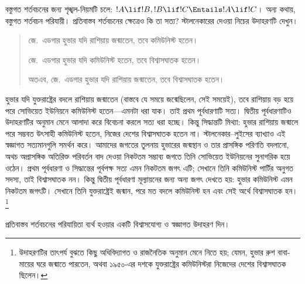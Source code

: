 \documentclass[../../../include/open-logic-section]{subfiles}
\begin{document}


বস্তুগত শর্তবচনের জন্য শৃঙ্খল-নিয়মটি চলে:
$!A \lif !B, !B \lif !C \Entails !A \lif !C$। অন্য কথায়,
বস্তুগত শর্তবচন পরিযায়ী। প্রতিবাস্তব শর্তবচনের ক্ষেত্রেও
কি তা সত্য? স্টালনেকারের দেওয়া নিচের উদাহরণটি দেখুন।
\begin{quote}
  জে.~এডগার হুভার যদি রাশিয়ায় জন্মাতেন, তবে কমিউনিস্ট হতেন।

  জে.~এডগার হুভার যদি কমিউনিস্ট হতেন, তবে বিশ্বাসঘাতক হতেন।

  অতএব, জে.~এডগার হুভার যদি রাশিয়ায় জন্মাতেন, তবে বিশ্বাসঘাতক হতেন।
\end{quote}
হুভার যদি যুক্তরাষ্ট্রের বদলে রাশিয়ায় জন্মাতেন (বাস্তবে যে সময়ে
জন্মেছিলেন, সেই সময়েই), তবে রাশিয়ায় বড় হয়ে পরে সোভিয়েত
ইউনিয়নে কমিউনিস্ট হতেন—এমনটা ধরা যাক। তাই প্রথম পূর্বধারণাটি সত্য। দ্বিতীয়
পূর্বধারণাটিও উদাহরণটির অনুমান মেনে আলাদা করে বিবেচনা করলে
সত্য ধরা হচ্ছে। কিন্তু সিদ্ধান্তটি
মিথ্যা:
হুভার রাশিয়ায় জন্মালে পরে সম্ভবত উৎসাহী কমিউনিস্ট
হতেন, নিজের দেশের বিশ্বাসঘাতক হতেন না। স্টালনেকার--লুইসের
ব্যাখ্যাও এই স্বজ্ঞাগত সত্যমানগুলি সমর্থন করে। আমাদের জগতের
তুলনায় হুভারের জন্মস্থান ও তার প্রাসঙ্গিক পরিণতি বদলানো,
অথচ অপ্রাসঙ্গিক অতিরিক্ত পরিবর্তন বাদ দেওয়া নিকটতম সম্ভাব্য জগতে তিনি
সোভিয়েত ইউনিয়নের সুনাগরিক হয়ে ওঠেন। প্রথম পূর্বধারণা ও
সিদ্ধান্তের পূর্বপক্ষ সত্য এমন নিকটতম জগৎ এটি; সেখানে তিনি
কমিউনিস্ট পার্টির অনুগত সদস্য, তাই বিশ্বাসঘাতক নন। কিন্তু
দ্বিতীয় পূর্বধারণা মূল্যায়নের জন্য অন্য জগৎ দেখতে হয়: হুভার
কমিউনিস্ট এমন নিকটতম জগৎটি। সেখানে তিনি যুক্তরাষ্ট্রেই জন্মান,
পরে মত বদলে কমিউনিস্ট হন এবং সেই অর্থে বিশ্বাসঘাতক হন।\footnote{উদাহরণটির
  তাৎপর্য বুঝতে কিছু অধিবিদ্যাগত ও রাজনৈতিক অনুমান মেনে নিতে হয়;
  যেমন, হুভার রুশ বাবা-মায়ের ঘরে জন্মাতে পারতেন, অথবা
  ১৯৫০-এর দশকে যুক্তরাষ্ট্রের কমিউনিস্টরা নিজেদের দেশের
  বিশ্বাসঘাতক ছিলেন।}

\begin{prob}
  প্রতিবাস্তব শর্তবচনের পরিযায়িতা ব্যর্থ হওয়ার একটি
  বিশ্বাসযোগ্য ও স্বজ্ঞাগত উদাহরণ দিন।
\end{prob}
\end{document}
